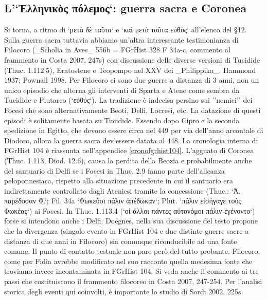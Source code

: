 {            \subsection*{L'`Ἑλληνικὸς πόλεμος`: guerra sacra e Coronea}
            Si torna, a ritmo di `μετὰ δὲ ταῦτα` e `καὶ μετὰ ταῦτα εὐθὺς` all'elenco del §12. Sulla guerra sacra tuttavia abbiamo un'altra interessante testimonianza di Filocoro (_Scholia in Aves_ 556b = FGrHist 328 F 34a-c, commento al frammento in Costa 2007, 247s)  con discussione delle diverse versioni di Tucidide (Thuc. 1.112.5), Eratostene e Teopompo  nel XXV dei _Philippika_.  Hammond 1937; Pownall 1998.
            Per Filocoro ci sono due guerre a distanza di 3 anni, non un unico episodio che alterna gli interventi di Sparta e Atene come sembra da Tucidide e Plutarco (`εὐθύς`). La tradizione è indecisa persino sui ''nemici'' dei Focesi che sono alternativamente Beoti, Delfi, Locresi, etc. La datazione di questi episodi è solitamente basata su Tucidide. Essendo dopo Cipro e la seconda spedizione in Egitto, che devono essere circa nel 449 per via dell'anno arcontale di Diodoro, allora la guerra sacra dev'essere datata al 448. La cronologia interna di FGrHist 104 è riassunta nell'appendice \ref{cronofgrhist104}.  
            L'agguato di Coronea (Thuc. 1.113, Diod. 12.6), causa la perdita della Beozia e probabilmente anche del santuario di Delfi se i Focesi in Thuc. 2.9 fanno parte dell'alleanza peloponnesiaca, rispetto alla situazione precedente in cui il santuario era indirettamente controllato dagli Ateniesi tramite la concessione (Thuc.: `Ἀ. παρέδοσαν Φ.`; Fil. 34a `Φωκεῦσι πάλιν ἀπέδωκαν`; Plut. `πάλιν εἰσήγαγε τοὺς Φωκέας`) ai Focesi. In Thuc. 1.113.4 (`οἱ ἄλλοι πάντες αὐτονόμοι πάλιν ἐγένοντο`) forse si intendono anche i Delfi.
            Doegnes, nella sua discussione del testo propone che la divergenza (singolo evento in FGrHist 104 e due distinte guerre sacre a distanza di due anni in Filocoro) sia comunque riconducibile ad una fonte comune. Il punto di contatto testuale non pare però del tutto probante. Filocoro, come per Fidia avrebbe modificato nel suo racconto quella medesima fonte che troviamo invece incontaminata in FGrHist 104. Si veda anche il commento ai tre passi che costituiscono il frammento filocoreo in Costa 2007, 247-254. Per l'analisi storica degli eventi qui coinvolti, è importante lo studio di Sordi 2002, 225s. 
}
